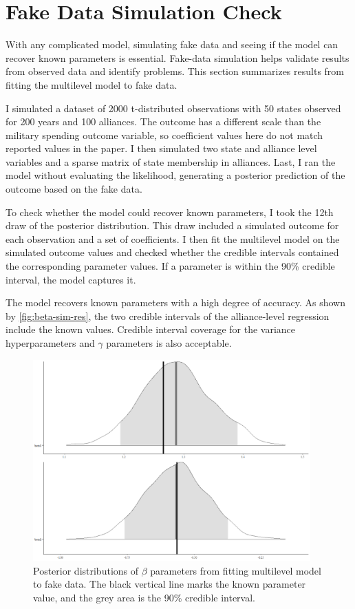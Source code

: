 \documentclass[12pt]{article}
\begin{document}
\section*{Fake Data Simulation Check}


With any complicated model, simulating fake data and seeing if the model can recover known parameters is essential. 
Fake-data simulation helps validate results from observed data and identify problems. 
This section summarizes results from fitting the multilevel model to fake data.


I simulated a dataset of 2000 t-distributed observations with 50 states observed for 200 years and 100 alliances. 
The outcome has a different scale than the military spending outcome variable, so coefficient values here do not match reported values in the paper.  
I then simulated two state and alliance level variables and a sparse matrix of state membership in alliances. 
Last, I ran the model without evaluating the likelihood, generating a posterior prediction of the outcome based on the fake data.


To check whether the model could recover known parameters, I took the 12th draw of the posterior distribution.
This draw included a simulated outcome for each observation and a set of coefficients. 
I then fit the multilevel model on the simulated outcome values and checked whether the credible intervals contained the corresponding parameter values. 
If a parameter is within the 90\% credible interval, the model captures it. 


The model recovers known parameters with a high degree of accuracy. 
As shown by \autoref{fig:beta-sim-res}, the two credible intervals of the alliance-level regression include the known values.
Credible interval coverage for the variance hyperparameters and $\gamma$ parameters is also acceptable. 


\begin{figure}[htbp]
	\centering
		\includegraphics[width=0.95\textwidth]{beta-sim-res.png}
	\caption{Posterior distributions of $\beta$ parameters from fitting multilevel model to fake data. The black vertical line marks the known parameter value, and the grey area is the 90\% credible interval.}
	\label{fig:beta-sim-res}
\end{figure}
\end{document}
